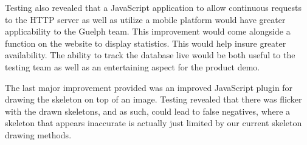 \documentclass{scrreprt}
\begin{document}
Testing also revealed that a JavaScript application to allow continuous requests
to the HTTP server as well as utilize a mobile platform would have greater
applicability to the Guelph team. This improvement would come alongside a
function on the website to display statistics. This would help insure greater
availability. The ability to track the database live would be both useful to
the testing team as well as an entertaining aspect for the product demo.

The last major improvement provided was an improved JavaScript plugin
for drawing the skeleton on top of an image. Testing revealed that there was
flicker with the drawn skeletons, and as such, could lead to false negatives,
where a skeleton that appears inaccurate is actually just limited by our
current skeleton drawing methods.
\end{document}
